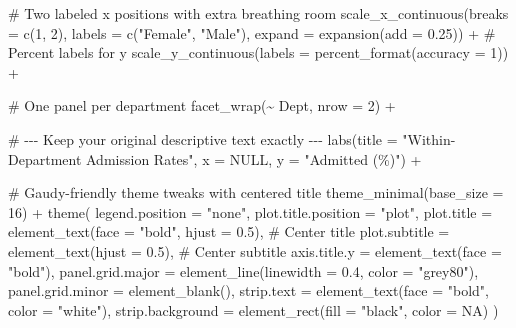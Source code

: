 \documentclass[
  letterpaper,
  DIV=11,
  numbers=noendperiod]{scrreprt}
\newenvironment{Shaded}{\begin{snugshade}}{\end{snugshade}}
\newcommand{\AttributeTok}[1]{\textcolor[rgb]{0.40,0.45,0.13}{#1}}
\newcommand{\CommentTok}[1]{\textcolor[rgb]{0.37,0.37,0.37}{#1}}
\newcommand{\ConstantTok}[1]{\textcolor[rgb]{0.56,0.35,0.01}{#1}}
\newcommand{\DecValTok}[1]{\textcolor[rgb]{0.68,0.00,0.00}{#1}}
\newcommand{\FloatTok}[1]{\textcolor[rgb]{0.68,0.00,0.00}{#1}}
\newcommand{\FunctionTok}[1]{\textcolor[rgb]{0.28,0.35,0.67}{#1}}
\newcommand{\NormalTok}[1]{\textcolor[rgb]{0.00,0.23,0.31}{#1}}
\newcommand{\SpecialCharTok}[1]{\textcolor[rgb]{0.37,0.37,0.37}{#1}}
\newcommand{\StringTok}[1]{\textcolor[rgb]{0.13,0.47,0.30}{#1}}
\begin{document}
\begin{Shaded}
\begin{Highlighting}[]
  \CommentTok{\# Two labeled x positions with extra breathing room}
  \FunctionTok{scale\_x\_continuous}\NormalTok{(}\AttributeTok{breaks =} \FunctionTok{c}\NormalTok{(}\DecValTok{1}\NormalTok{, }\DecValTok{2}\NormalTok{), }\AttributeTok{labels =} \FunctionTok{c}\NormalTok{(}\StringTok{"Female"}\NormalTok{, }\StringTok{"Male"}\NormalTok{),}
                     \AttributeTok{expand =} \FunctionTok{expansion}\NormalTok{(}\AttributeTok{add =} \FloatTok{0.25}\NormalTok{)) }\SpecialCharTok{+}
  \CommentTok{\# Percent labels for y}
  \FunctionTok{scale\_y\_continuous}\NormalTok{(}\AttributeTok{labels =} \FunctionTok{percent\_format}\NormalTok{(}\AttributeTok{accuracy =} \DecValTok{1}\NormalTok{)) }\SpecialCharTok{+}

  \CommentTok{\# One panel per department}
  \FunctionTok{facet\_wrap}\NormalTok{(}\SpecialCharTok{\textasciitilde{}}\NormalTok{ Dept, }\AttributeTok{nrow =} \DecValTok{2}\NormalTok{) }\SpecialCharTok{+}

  \CommentTok{\# {-}{-}{-} Keep your original descriptive text exactly {-}{-}{-}}
  \FunctionTok{labs}\NormalTok{(}\AttributeTok{title =} \StringTok{"Within{-}Department Admission Rates"}\NormalTok{,}
       \AttributeTok{x =} \ConstantTok{NULL}\NormalTok{, }\AttributeTok{y =} \StringTok{"Admitted (\%)"}\NormalTok{) }\SpecialCharTok{+}

  \CommentTok{\# Gaudy{-}friendly theme tweaks with centered title}
  \FunctionTok{theme\_minimal}\NormalTok{(}\AttributeTok{base\_size =} \DecValTok{16}\NormalTok{) }\SpecialCharTok{+}
  \FunctionTok{theme}\NormalTok{(}
    \AttributeTok{legend.position =} \StringTok{"none"}\NormalTok{,}
    \AttributeTok{plot.title.position =} \StringTok{"plot"}\NormalTok{,}
    \AttributeTok{plot.title =} \FunctionTok{element\_text}\NormalTok{(}\AttributeTok{face =} \StringTok{"bold"}\NormalTok{, }\AttributeTok{hjust =} \FloatTok{0.5}\NormalTok{),   }\CommentTok{\# Center title}
    \AttributeTok{plot.subtitle =} \FunctionTok{element\_text}\NormalTok{(}\AttributeTok{hjust =} \FloatTok{0.5}\NormalTok{),               }\CommentTok{\# Center subtitle}
    \AttributeTok{axis.title.y =} \FunctionTok{element\_text}\NormalTok{(}\AttributeTok{face =} \StringTok{"bold"}\NormalTok{),}
    \AttributeTok{panel.grid.major =} \FunctionTok{element\_line}\NormalTok{(}\AttributeTok{linewidth =} \FloatTok{0.4}\NormalTok{, }\AttributeTok{color =} \StringTok{"grey80"}\NormalTok{),}
    \AttributeTok{panel.grid.minor =} \FunctionTok{element\_blank}\NormalTok{(),}
    \AttributeTok{strip.text =} \FunctionTok{element\_text}\NormalTok{(}\AttributeTok{face =} \StringTok{"bold"}\NormalTok{, }\AttributeTok{color =} \StringTok{"white"}\NormalTok{),}
    \AttributeTok{strip.background =} \FunctionTok{element\_rect}\NormalTok{(}\AttributeTok{fill =} \StringTok{"black"}\NormalTok{, }\AttributeTok{color =} \ConstantTok{NA}\NormalTok{)}
\NormalTok{  )}
\end{Highlighting}
\end{Shaded}
\end{document}

